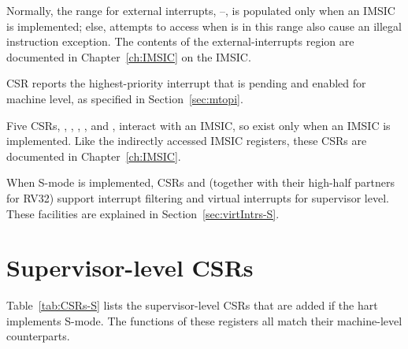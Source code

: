 Normally, the range for external interrupts, --, is
populated only when an IMSIC is implemented; else, attempts to access
 when  is in this range also cause an illegal
instruction exception.
The contents of the external-interrupts region are documented in
Chapter~\ref{ch:IMSIC} on the IMSIC.

CSR  reports the highest-priority interrupt that is pending
and enabled for machine level, as specified in Section~\ref{sec:mtopi}.

Five CSRs, , , ,
, and , interact with an IMSIC, so exist only
when an IMSIC is implemented.
Like the indirectly accessed IMSIC registers, these CSRs are documented
in Chapter~\ref{ch:IMSIC}.

When \mbox{S-mode} is implemented, CSRs  and 
(together with their high-half partners for RV32) support interrupt
filtering and virtual interrupts for supervisor level.
These facilities are explained in Section~\ref{sec:virtIntrs-S}.

\section{Supervisor-level CSRs}

Table~\ref{tab:CSRs-S} lists the supervisor-level CSRs that are added
if the hart implements \mbox{S-mode}.
The functions of these registers all match their machine-level
counterparts.

